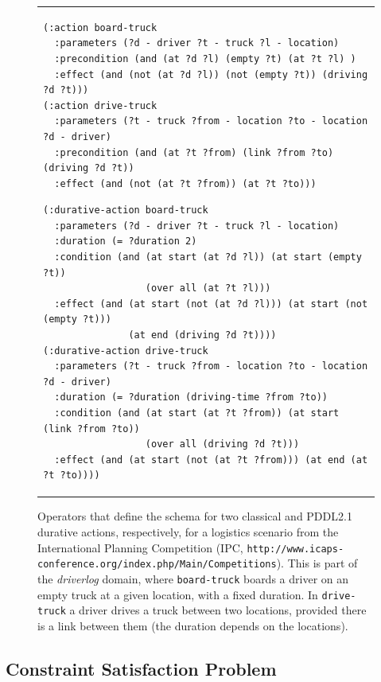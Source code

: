 \documentclass[runningheads]{llncs}
\begin{document}
\begin{figure}
\caption{Operators that define the schema for two classical and PDDL2.1 durative actions, respectively, for a logistics scenario from the International Planning Competition (IPC, \texttt{http://www.icaps-conference.org/index.php/Main/Competitions}). This is part of the \emph{driverlog} domain, where \texttt{board-truck} boards a driver on an empty truck at a given location, with a fixed duration. In \texttt{drive-truck} a driver drives a truck between two locations, provided there is a link between them (the duration depends on the locations).}

\begin{tabular}{p{\textwidth}}
\begin{verbatim}
(:action board-truck
  :parameters (?d - driver ?t - truck ?l - location)
  :precondition (and (at ?d ?l) (empty ?t) (at ?t ?l) )
  :effect (and (not (at ?d ?l)) (not (empty ?t)) (driving ?d ?t)))
(:action drive-truck
  :parameters (?t - truck ?from - location ?to - location ?d - driver)
  :precondition (and (at ?t ?from) (link ?from ?to) (driving ?d ?t))
  :effect (and (not (at ?t ?from)) (at ?t ?to)))
\end{verbatim}

\begin{verbatim}
(:durative-action board-truck
  :parameters (?d - driver ?t - truck ?l - location)
  :duration (= ?duration 2)
  :condition (and (at start (at ?d ?l)) (at start (empty ?t))
                  (over all (at ?t ?l)))
  :effect (and (at start (not (at ?d ?l))) (at start (not (empty ?t)))
               (at end (driving ?d ?t))))
(:durative-action drive-truck
  :parameters (?t - truck ?from - location ?to - location ?d - driver)
  :duration (= ?duration (driving-time ?from ?to))
  :condition (and (at start (at ?t ?from)) (at start (link ?from ?to))
                  (over all (driving ?d ?t)))
  :effect (and (at start (not (at ?t ?from))) (at end (at ?t ?to))))
\end{verbatim}

\end{tabular}
\label{fig:exampleactions}

\end{figure}




\subsection{Constraint Satisfaction Problem}
\label{sec:csp}
\end{document}
